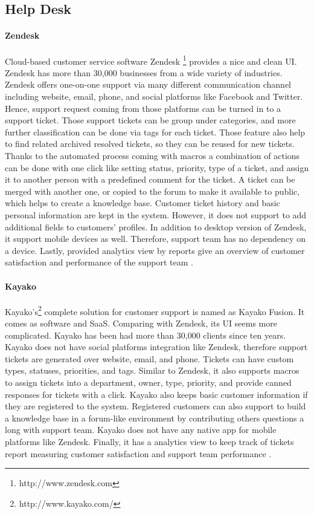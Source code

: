 \subsection{Help Desk}
\label{subsec:3.3.2:HelpDeskSoft}


\paragraph{Zendesk}
Cloud-based customer service software Zendesk \footnote{http://www.zendesk.com} provides a nice and clean \ac{UI}. Zendesk has more than 30,000 businesses from a wide variety of industries. Zendesk offers one-on-one support via many different communication channel including website, email, phone, and social platforms like Facebook and Twitter. Hence, support request coming from those platforms can be turned in to a support ticket. Those support tickets can be group under categories, and more further classification can be done via tags for each ticket. Those feature also help to find related archived resolved tickets, so they can be reused for new tickets. Thanks to the automated process coming with macros a combination of actions can be done with one click like setting status, priority, type of a ticket, and assign it to another person with a predefined comment for the ticket. A ticket can be merged with another one, or copied to the forum to make it available to public, which helps to create a knowledge base. Customer ticket history and basic personal information are kept in the system. However, it does not support to add additional fields to customers' profiles. In addition to desktop version of Zendesk, it support mobile devices as well. Therefore, support team has no dependency on a device. Lastly, provided analytics view by reports give an overview of customer satisfaction and performance of the support team \citep{Zendesk2013,Zendesk2013a}.

\paragraph{Kayako}
Kayako's\footnote{http://www.kayako.com/} complete solution for customer support is named as Kayako Fusion. It comes as software and \ac{SaaS}. Comparing with Zendesk, its \ac{UI} seems more complicated. Kayako has been had more than 30,000 clients since ten years. Kayako does not have social platforms integration like Zendesk, therefore support tickets are generated over website, email, and phone. Tickets can have custom types, statuses, priorities, and tags. Similar to Zendesk, it also supports macros to assign tickets into a department, owner, type, priority, and provide canned responses for tickets with a click. Kayako also keeps basic customer information if they are registered to the system. Registered customers can also support to build a knowledge base in a forum-like environment by contributing others questions a long with support team. Kayako does not have any native app for mobile platforms like Zendesk. Finally, it has a analytics view to keep track of tickets report measuring customer satisfaction and support team performance \citep{KayakoInc.2013,KayakoInc.2013a}.

